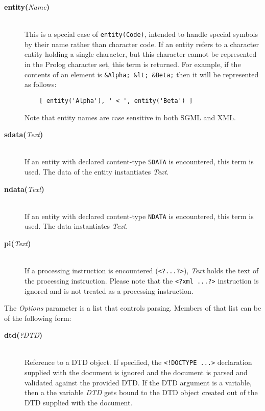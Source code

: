 \begin{description}
\begin{description}
  \item[{\bf entity}{\bf (}{\it Name}{\bf )}]\mbox{}\\
    This is a special case of {\tt entity(Code)}, intended to handle 
    special symbols by their name rather than character code.
    If an entity refers to a character entity holding a single character, 
    but this character cannot be represented in the Prolog character set, 
    this term is returned. For example, if the contents of an element is
    \verb$&Alpha; &lt; &Beta;$ then it will be represented as follows:
\begin{verbatim}
    [ entity('Alpha'), ' < ', entity('Beta') ]
\end{verbatim}
    Note that entity names are case sensitive in both SGML and XML.

  \item[{\bf sdata}{\bf (}{\it Text}{\bf )}]\mbox{}\\
    If an entity with declared content-type {\tt SDATA} is encountered, this 
    term is used. The data of the entity instantiates {\it Text}.

  \item[{\bf ndata}{\bf (}{\it Text}{\bf )}]\mbox{}\\
    If an entity with declared content-type {\tt NDATA} is encountered, this 
    term is used. The data instantiates {\it Text}.
    
  \item[{\bf pi}{\bf (}{\it Text}{\bf )}]\mbox{}\\
    If a processing instruction is encountered (\verb$<?...?>$), {\it Text} holds the text of the processing instruction. Please note that the
    \verb$<?xml ...?>$ instruction is ignored and is not treated as a
    processing instruction.
  \end{description}

  The {\it Options} parameter is a list that controls parsing. Members of
  that list can be of the following form:
  \begin{description}

  \item[{\bf dtd}{\bf (}{\it ?DTD}{\bf )}]\mbox{}\\
    Reference to a DTD object. If specified, the \verb$<!DOCTYPE ...>$
    declaration supplied with the document
    is ignored and the document is parsed and validated against 
    the provided DTD. If the DTD argument is a variable, then
    a the variable \emph{DTD} gets bound to
    the DTD object created out of the DTD supplied with the document.


\end{description}
\end{description}
